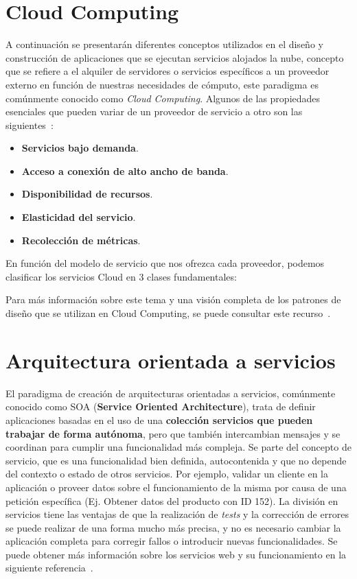 \section{Cloud Computing}\label{sec:cloud}
A continuación se presentarán diferentes conceptos utilizados en el diseño y construcción de aplicaciones que se ejecutan servicios alojados la nube, concepto que se refiere a el alquiler de servidores o servicios específicos a un proveedor externo en función de nuestras necesidades de cómputo, este paradigma es comúnmente conocido como \emph{Cloud Computing}. Algunos de las propiedades esenciales que pueden variar de un proveedor de servicio a otro son las siguientes~\cite{cloudfunds}:

\begin{itemize}
\item \textbf{Servicios bajo demanda}.
\item \textbf{Acceso a conexión de alto ancho de banda}.
\item \textbf{Disponibilidad de recursos}.
\item \textbf{Elasticidad del servicio}.
\item \textbf{Recolección de métricas}.
\end{itemize}

En función del modelo de servicio que nos ofrezca cada proveedor, podemos clasificar los servicios Cloud en 3 clases fundamentales:

Para más información sobre este tema y una visión completa de los patrones de diseño que se utilizan en Cloud Computing, se puede consultar este recurso~\cite{cloudpatts}.

\section{Arquitectura orientada a servicios}\label{sec:soa}
El paradigma de creación de arquitecturas orientadas a servicios, comúnmente conocido como SOA (\textbf{Service Oriented Architecture}), trata de definir aplicaciones basadas en el uso de una \textbf{colección servicios que pueden trabajar de forma autónoma}, pero que también intercambian mensajes y se coordinan para cumplir una funcionalidad más compleja. Se parte del concepto de servicio, que es una funcionalidad bien definida, autocontenida y que no depende del contexto o estado de otros servicios. Por ejemplo, validar un cliente en la aplicación o proveer datos sobre el funcionamiento de la misma por causa de una petición específica (Ej. Obtener datos del producto con ID 152). La división en servicios tiene las ventajas de que la realización de \textit{tests} y la corrección de errores se puede realizar de una forma mucho más precisa, y no es necesario cambiar la aplicación completa para corregir fallos o introducir nuevas funcionalidades. Se puede obtener más información sobre los servicios web y su funcionamiento en la siguiente referencia~\cite{wscom}.

